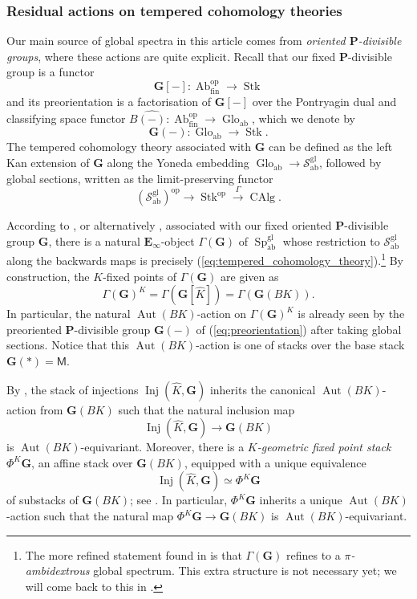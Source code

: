 \documentclass[11pt, a4paper]{article}
\newcommand{\ab}{\mathrm{ab}}
\newcommand{\fin}{\mathrm{fin}}
\newcommand{\gl}{\mathrm{gl}}
\newcommand{\1}{\mathbf{1}}
\DeclareMathOperator{\Ab}{Ab}
\DeclareMathOperator{\CAlg}{CAlg}
\DeclareMathOperator{\Glo}{Glo}
\DeclareMathOperator{\Inj}{Inj}
\DeclareMathOperator{\Stk}{Stk}
\DeclareMathOperator{\Sp}{Sp}
\newcommand{\Spc}{\mathcal{S}}
\DeclareMathOperator{\Aut}{Aut}
\newcommand{\op}{\mathrm{op}}
\newcommand{\dual}[1]{{\widehat{#1}}}
\newcommand{\E}{\mathbf{E}}
\newcommand{\G}{\mathbf{G}}
\newcommand{\M}{\mathsf{M}}
\renewcommand{\P}{\mathbf{P}}
\newcommand{\Ga}{\Gamma}
\theoremstyle{plain}
\theoremstyle{definition}
\theoremstyle{remark}\numberwithin{equation}{section}
\begin{document}
\subsubsection{Residual actions on tempered cohomology theories}
Our main source of global spectra in this article comes from \emph{oriented $\P$-divisible groups}, where these actions are quite explicit. Recall that our fixed $\P$-divisible group is a functor
\begin{equation}\label{eq:pdivisiblegroup}\G[-] \colon \Ab_\fin^\op \to \Stk\end{equation}
and its preorientation is a factorisation of $\G[-]$ over the Pontryagin dual and classifying space functor $B \dual{(-)} \colon \Ab_\fin^\op \to \Glo_\ab$, which we denote by
\begin{equation}\label{eq:preorientation}\G(-) \colon \Glo_\ab \to \Stk.\end{equation}
The tempered cohomology theory associated with $\G$ can be defined as the left Kan extension of $\G$ along the Yoneda embedding $\Glo_\ab \to \Spc_\ab^\gl$, followed by global sections, written as the limit-preserving functor
\begin{equation}\label{eq:tempered_cohomology_theory}
(\Spc_\ab^\gl)^\op \to \Stk^\op \xrightarrow{\Ga} \CAlg.
\end{equation}

According to \cite[Th.1.1.1]{temperedglobal}, or alternatively \cite[Th.E]{gepner2024global2ringsgenuinerefinements}, associated with our fixed oriented $\P$-divisible group $\G$, there is a natural $\E_\infty$-object $\Ga(\G)$ of $\Sp^\gl_\ab$ whose restriction to $\Spc_\ab^\gl$ along the backwards maps is precisely (\ref{eq:tempered_cohomology_theory}).\footnote{The more refined statement found in \cite{temperedglobal} is that $\Ga(\G)$ refines to a \emph{$\pi$-ambidextrous} global spectrum. This extra structure is not necessary yet; we will come back to this in .} By construction, the $K$-fixed points of $\Ga(\G)$ are given as
\[\Ga(\G)^K = \Ga (\G[\dual{K}]) = \Ga(\G(BK)). \]
In particular, the natural $\Aut(BK)$-action on $\Ga(\G)^K$ is already seen by the preoriented $\P$-divisible group $\G(-)$ of (\ref{eq:preorientation}) after taking global sections. Notice that this $\Aut(BK)$-action is one of stacks over the base stack $\G(\ast) = \M$.

By , the stack of injections $\Inj(\dual{K}, \G)$ inherits the canonical $\Aut(BK)$-action from $\G(BK)$ such that the natural inclusion map
\[\Inj(\dual{K}, \G) \to \G(BK)\]
is $\Aut(BK)$-equivariant. Moreover, there is a \emph{$K$-geometric fixed point stack} $\Phi^K \G$, an affine stack over $\G(BK)$, equipped with a unique equivalence
\begin{equation}\label{eq:unique_equivalence}\Inj(\dual{K}, \G) \simeq \Phi^K \G\end{equation}
of substacks of $\G(BK)$; see \cite[Th.F]{temperedglobal}. In particular, $\Phi^K \G$ inherits a unique $\Aut(BK)$-action such that the natural map $\Phi^K \G \to \G(BK)$ is $\Aut(BK)$-equivariant.
\end{document}
